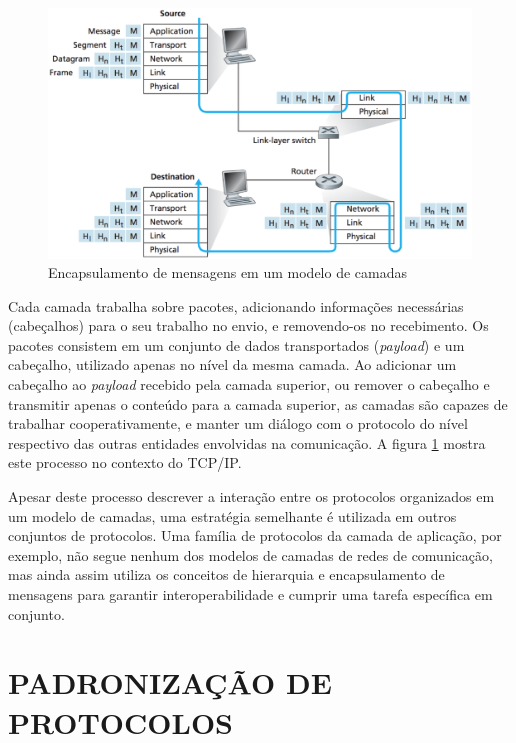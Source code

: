 \begin{figure}[h]
	\centering
		\includegraphics[keepaspectratio=true,scale=0.6]{figuras/encapsulamento.eps}
	\caption{Encapsulamento de mensagens em um modelo de camadas \cite{kurose2012}}
	\label{fig:encapsulamento}
\end{figure}

Cada camada trabalha sobre pacotes, adicionando informações necessárias (cabeçalhos)
para o seu trabalho no envio, e removendo-os no recebimento. Os pacotes consistem em
um conjunto de dados transportados (\textit{payload}) e um cabeçalho, utilizado
apenas no nível da mesma camada. Ao adicionar um cabeçalho ao \textit{payload}
recebido pela camada superior, ou remover o cabeçalho e transmitir apenas o conteúdo
para a camada superior, as camadas são capazes de trabalhar cooperativamente, e
manter um diálogo com o protocolo do nível respectivo das outras entidades
envolvidas na comunicação. A figura \ref{fig:encapsulamento} mostra este processo no
contexto do TCP/IP.

Apesar deste processo descrever a interação entre os protocolos organizados em um
modelo de camadas, uma estratégia semelhante é utilizada em outros conjuntos de
protocolos. Uma família de protocolos da camada de aplicação, por exemplo, não
segue nenhum dos modelos de camadas de redes de comunicação, mas ainda assim utiliza
os conceitos de hierarquia e encapsulamento de mensagens para garantir
interoperabilidade e cumprir uma tarefa específica em conjunto.

\section{PADRONIZAÇÃO DE PROTOCOLOS}

